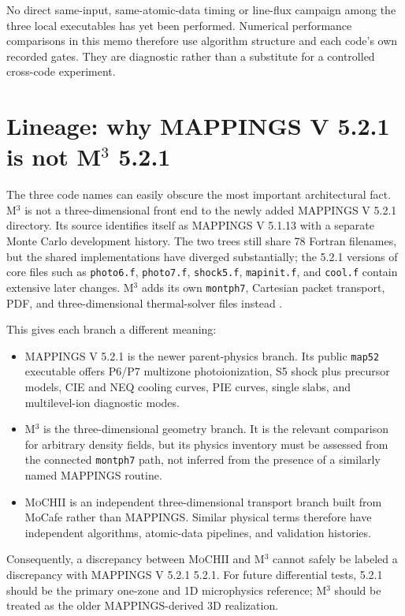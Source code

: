 \documentclass[english,a4paper]{my_memo}
\newcommand{\code}[1]{\texttt{#1}}
\newcommand{\MoCHII}{\textsc{MoCHII}}
\newcommand{\Mthree}{M$^3$}
\newcommand{\Mappings}{MAPPINGS V 5.2.1}
\begin{document}
No direct same-input, same-atomic-data timing or line-flux campaign among
the three local executables has yet been performed.  Numerical performance
comparisons in this memo therefore use algorithm structure and each code's
own recorded gates.  They are diagnostic rather than a substitute for a
controlled cross-code experiment.

\section{Lineage: why MAPPINGS V 5.2.1 is not
\texorpdfstring{M$^3$}{M3} 5.2.1}

The three code names can easily obscure the most important architectural
fact.  \Mthree{} is not a three-dimensional front end to the newly added
\Mappings{} directory.  Its source identifies itself as MAPPINGS V
5.1.13 with a separate Monte Carlo development history.  The two trees
still share 78 Fortran filenames, but the shared implementations have
diverged substantially; the 5.2.1 versions of core files such as
\code{photo6.f}, \code{photo7.f}, \code{shock5.f}, \code{mapinit.f}, and
\code{cool.f} contain extensive later changes.  \Mthree{} adds its own
\code{montph7}, Cartesian packet transport, PDF, and three-dimensional
thermal-solver files instead \cite{jin2022,mappings521}.

This gives each branch a different meaning:

\begin{itemize}[leftmargin=2em]
\item \Mappings{} is the newer parent-physics branch.  Its public
  \code{map52} executable offers P6/P7 multizone photoionization, S5
  shock plus precursor models, CIE and NEQ cooling curves, PIE curves,
  single slabs, and multilevel-ion diagnostic modes.
\item \Mthree{} is the three-dimensional geometry branch.  It is the
  relevant comparison for arbitrary density fields, but its physics
  inventory must be assessed from the connected \code{montph7} path,
  not inferred from the presence of a similarly named MAPPINGS routine.
\item \MoCHII{} is an independent three-dimensional transport branch built
  from MoCafe rather than MAPPINGS.  Similar physical terms therefore have
  independent algorithms, atomic-data pipelines, and validation histories.
\end{itemize}

Consequently, a discrepancy between \MoCHII{} and \Mthree{} cannot safely
be labeled a discrepancy with \Mappings{} 5.2.1.  For future differential
tests, 5.2.1 should be the primary one-zone and 1D microphysics reference;
\Mthree{} should be treated as the older MAPPINGS-derived 3D realization.
\end{document}
